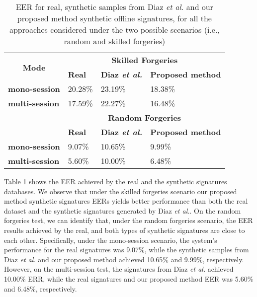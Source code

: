 \begin{table}[!htb]
\renewcommand{\arraystretch}{1.3}
\caption{EER for real, synthetic samples from Diaz \textit{et al.} \cite{diaz2014generation} and our proposed method synthetic offline signatures, for all the approaches considered under the two possible scenarios (i.e., random and skilled forgeries)}
\label{exp1_results_table}
\centering
\begin{tabular}{|l|l|l|l|}
    \hline
    \multicolumn{1}{|c|}{\multirow{2}{*}{\textbf{Mode}}} & \multicolumn{3}{c|}{\textbf{Skilled Forgeries}}          \\ \cline{2-4} 
    \multicolumn{1}{|c|}{}                               & \textbf{Real} & \textbf{Diaz \textit{et al.}} & \textbf{Proposed method} \\ \hline
    \textbf{mono-session}                                & 20.28\%            & 23.19\%            & 18.38\%                       \\ \hline
    \textbf{multi-session}                               & 17.59\%            & 22.27\%            & 16.48\%                       \\ \hline
    \multirow{2}{*}{}                                    & \multicolumn{3}{c|}{\textbf{Random Forgeries}}           \\ \cline{2-4} 
    & \textbf{Real} & \textbf{Diaz \textit{et al.}} & \textbf{Proposed method} \\ \hline
    \textbf{mono-session}                                & 9.07\%            & 10.65\%            & 9.99\%                       \\ \hline
    \textbf{multi-session}                               & 5.60\%            & 10.00\%            & 6.48\%                       \\ \hline
\end{tabular}

\end{table}

Table \ref{exp1_results_table} shows the EER achieved by the
real and the synthetic signatures databases. We observe that under the skilled forgeries scenario our proposed method synthetic signatures EERs yields better performance than both the real dataset and the synthetic signatures generated by Diaz \textit{et al.}. On the random forgeries test, we can identify that, under the random forgeries scenario, the EER results achieved by the real, and both types of synthetic signatures are close to each other. Specifically, under the mono-session scenario, the system's performance for the real signatures was 9.07\%, while the synthetic samples from Diaz \textit{et al.} and our proposed method achieved 10.65\% and 9.99\%, respectively. However, on the multi-session test, the signatures from Diaz \textit{et al.} achieved 10.00\% ERR, while the real signatures and our proposed method EER was 5.60\% and 6.48\%, respectively.


